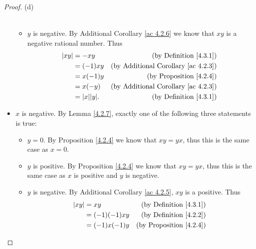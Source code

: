 \begin{proof}{(d)}
\begin{itemize}
\begin{itemize}
\begin{align*}
                        \end{align*}
                  \item \(y\) is negative.
                        By Additional Corollary \ref{ac 4.2.6} we know that \(xy\) is a negative rational number.
                        Thus
                        \begin{align*}
                            \abs{xy} & = -xy              & \text{(by Definition \ref{4.3.1})}              \\
                                     & = (-1)xy           & \text{(by Additional Corollary \ref{ac 4.2.3})} \\
                                     & = x(-1)y           & \text{(by Proposition \ref{4.2.4})}             \\
                                     & = x(-y)            & \text{(by Additional Corollary \ref{ac 4.2.3})} \\
                                     & = \abs{x} \abs{y}. & \text{(by Definition \ref{4.3.1})}              \\
                        \end{align*}
              \end{itemize}
        \item \(x\) is negative.
              By Lemma \ref{4.2.7}, exactly one of the following three statements is true:
              \begin{itemize}
                  \item \(y = 0\).
                        By Proposition \ref{4.2.4} we know that \(xy = yx\), thus this is the same case as \(x = 0\).
                  \item \(y\) is positive.
                        By Proposition \ref{4.2.4} we know that \(xy = yx\), thus this is the same case as \(x\) is positive and \(y\) is negative.
                  \item \(y\) is negative.
                        By Additional Corollary \ref{ac 4.2.5}, \(xy\) is a positive.
                        Thus
                        \begin{align*}
                            \abs{xy} & = xy               & \text{(by Definition \ref{4.3.1})}              \\
                                     & = (-1)(-1)xy       & \text{(by Definition \ref{4.2.2})}              \\
                                     & = (-1)x(-1)y       & \text{(by Proposition \ref{4.2.4})}             \\

\end{align*}
\end{itemize}
\end{itemize}
\end{proof}

